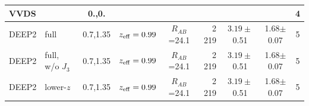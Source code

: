 \documentclass[usenatbib]{mn2e}
\begin{document}
\begin{table}
\begin{center}
\begin{tabular}{llcccrccc}
\hline 
VVDS       &            & 0.,0.      &                &                          &          &                       &             &             4 \\
\hline
DEEP2     &full &0.7,1.35   & $z_{\rm eff}=0.99$ & $R_{AB}$=24.1            &    2 219 & $3.19\pm$0.51         & 1.68$\pm$0.07 &           5 \\
DEEP2     &full, w/o $J_{3}$ &0.7,1.35   & $z_{\rm eff}=0.99$ & $R_{AB}$=24.1            &    2 219 & $3.19\pm$0.51         & 1.68$\pm$0.07  &  5         \\
DEEP2     &lower-$z$ &0.7,1.35   & $z_{\rm eff}=0.99$ & $R_{AB}$=24.1            &    2 219 & $3.19\pm$0.51         & 1.68$\pm$0.07  &        5  \\

\end{tabular}
\end{center}
\end{table}
\end{document}
